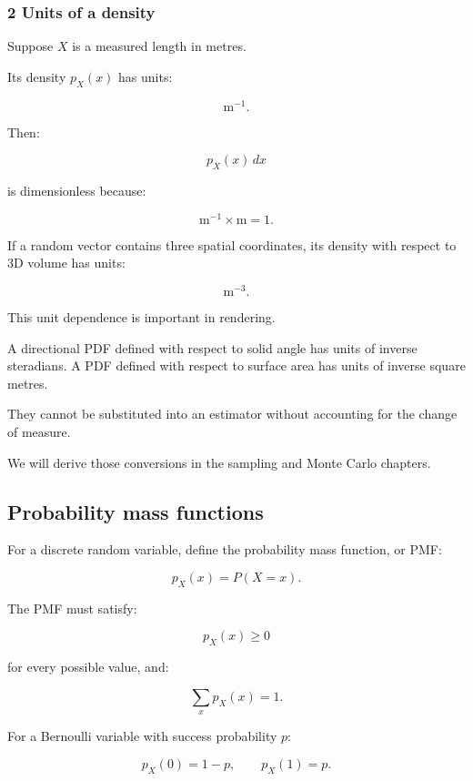 \subsubsection{2 Units of a density}\label{02-foundations-ii-ch023-units-of-a-density}

\hypertarget{02-foundations-ii-ch023-units-of-a-density}{}

Suppose \(X\) is a measured length in metres.

Its density \(p_X(x)\) has units:

\[
 \mathrm m^{-1}.
\]

Then:

\[
 p_X(x)\,dx
\]

is dimensionless because:

\[
 \mathrm m^{-1}\times\mathrm m=1.
\]

If a random vector contains three spatial coordinates, its density with respect to 3D volume has units:

\[
 \mathrm m^{-3}.
\]

This unit dependence is important in rendering.

A directional PDF defined with respect to solid angle has units of inverse steradians. A PDF defined with respect to surface area has units of inverse square metres.

They cannot be substituted into an estimator without accounting for the change of measure.

We will derive those conversions in the sampling and Monte Carlo chapters.

\subsection{Probability mass functions}\label{02-foundations-ii-ch023-probability-mass-functions}

\hypertarget{02-foundations-ii-ch023-probability-mass-functions}{}

For a discrete random variable, define the probability mass function, or PMF:

\[
 \boxed{ p_X(x)=P(X=x) }.
\]

The PMF must satisfy:

\[
 p_X(x)\ge0
\]

for every possible value, and:

\[
 \boxed{ \sum_xp_X(x)=1 }.
\]

For a Bernoulli variable with success probability \(p\):

\[
 p_X(0)=1-p, \qquad p_X(1)=p.
\]

